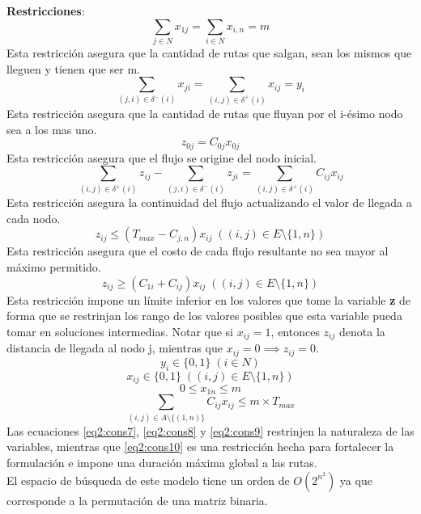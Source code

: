 \noindent
\textbf{Restricciones}:\\
\begin{equation}\label{eq2:cons1}
    \sum_{j\in N}x_{1j} = \sum_{i\in N}x_{i,n} = m
\end{equation}
Esta restricci\'on asegura que la cantidad de rutas que salgan, sean los mismos que lleguen y tienen que ser m.
\begin{equation}\label{eq2:cons2}
    \sum_{(j,i)\in \delta^{-}(i)}x_{ji} = \sum_{(i,j)\in \delta^{+}(i)}x_{ij} = y_{i} 
\end{equation}
Esta restricci\'on asegura que la cantidad de rutas que fluyan por el i-\'esimo nodo sea a los mas uno.
\begin{equation}\label{eq2:cons3}
    z_{0j} = C_{0j}x_{0j}
\end{equation}
Esta restricci\'on asegura que el flujo se origine del nodo inicial.
\begin{equation}\label{eq2:cons4}
    \sum_{(i,j)\in \delta^{+}(i)}z_{ij} - \sum_{(j,i)\in \delta^{-}(i)}z_{ji} = \sum_{(i,j)\in \delta^{+}(i)}C_{ij}x_{ij}
\end{equation}
Esta restricci\'on asegura la continuidad del flujo actualizando el valor de llegada a cada nodo.
\begin{equation}\label{eq2:cons5}
    z_{ij} \leq (T_{max} - C_{j,n})x_{ij}\; ((i,j)\in E\setminus\{1,n\})
\end{equation}
Esta restricci\'on asegura que el costo de cada flujo resultante no sea mayor al m\'aximo permitido.\\
\begin{equation}\label{eq2:cons6}
    z_{ij} \geq (C_{1i} + C_{ij})x_{ij}\; ((i,j)\in E\setminus\{1,n\})
\end{equation}
Esta restricci\'on impone un l\'imite inferior en los valores que tome la variable \textbf{z} de forma que se restrinjan los rango de los valores posibles que esta variable pueda tomar en soluciones intermedias. Notar que si $x_{ij} = 1$, entonces $z_{ij}$ denota la distancia de llegada al nodo j, mientras que $x_{ij} = 0 \implies z_{ij} = 0$.
\begin{equation}\label{eq2:cons7}
    y_{i} \in \{0,1\}\; (i\in N)
\end{equation}
\begin{equation}\label{eq2:cons8}
    x_{ij} \in \{0,1\}\; ((i,j)\in E\setminus\{1,n\})
\end{equation}
\begin{equation}\label{eq2:cons9}
    0 \leq x_{1n} \leq m
\end{equation}
\begin{equation}\label{eq2:cons10}
    \sum_{(i,j)\in A\setminus\{(1,n)\}}C_{ij}x_{ij}\leq m \times T_{max}
\end{equation}
Las ecuaciones \eqref{eq2:cons7}, \eqref{eq2:cons8} y \eqref{eq2:cons9} restrinjen la naturaleza de las variables, mientras que \eqref{eq2:cons10} es una restricci\'on hecha para fortalecer la formulaci\'on e impone una duraci\'on m\'axima global a las rutas.\\
El espacio de b\'usqueda de este modelo tiene un orden de $O(2^{n^2})$ ya que corresponde a la permutaci\'on de una matriz binaria.
